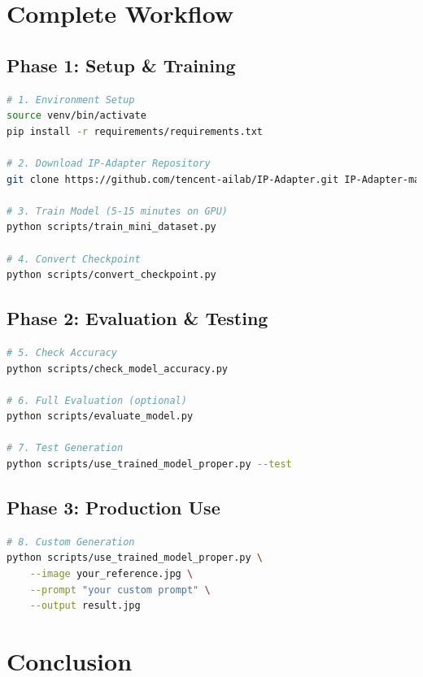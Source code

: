 \documentclass[11pt,a4paper]{article}
\begin{document}
\section{Complete Workflow}

\subsection{Phase 1: Setup \& Training}

\begin{lstlisting}[language=bash,caption=Setup and Training Commands]
# 1. Environment Setup
source venv/bin/activate
pip install -r requirements/requirements.txt

# 2. Download IP-Adapter Repository
git clone https://github.com/tencent-ailab/IP-Adapter.git IP-Adapter-main

# 3. Train Model (5-15 minutes on GPU)
python scripts/train_mini_dataset.py

# 4. Convert Checkpoint
python scripts/convert_checkpoint.py
\end{lstlisting}

\subsection{Phase 2: Evaluation \& Testing}

\begin{lstlisting}[language=bash,caption=Evaluation Commands]
# 5. Check Accuracy
python scripts/check_model_accuracy.py

# 6. Full Evaluation (optional)
python scripts/evaluate_model.py

# 7. Test Generation
python scripts/use_trained_model_proper.py --test
\end{lstlisting}

\subsection{Phase 3: Production Use}

\begin{lstlisting}[language=bash,caption=Production Usage]
# 8. Custom Generation
python scripts/use_trained_model_proper.py \
    --image your_reference.jpg \
    --prompt "your custom prompt" \
    --output result.jpg
\end{lstlisting}

\section{Conclusion}
\end{document}
